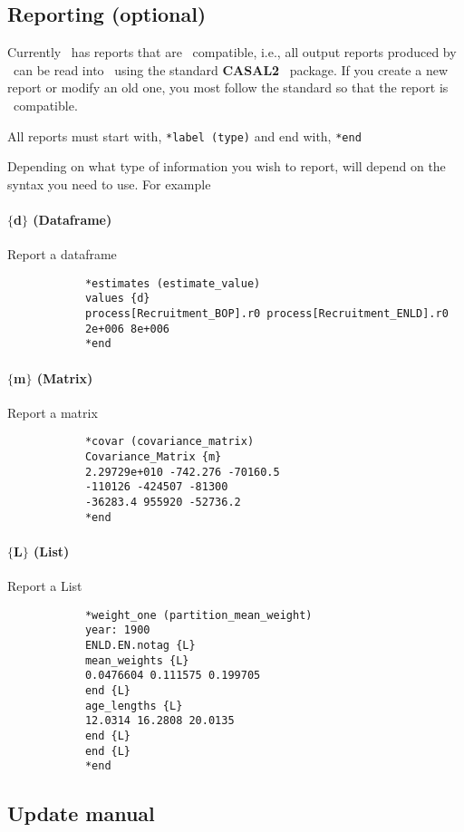 \subsection{Reporting (optional)}

Currently \CNAME\ has reports that are \R\ compatible, i.e., all output reports produced by \CNAME\ can be read into \R\ using the standard  \textbf{CASAL2} \R\ package. If you create a new report or modify an old one, you most follow the standard so that the report is \R\ compatible.

All reports must start with,
\texttt{*label (type)}
and end with,
\texttt{*end}

Depending on what type of information you wish to report, will depend on the syntax you need to use. For example

\paragraph*{$\{$d$\}$ (Dataframe)}
Report a dataframe
{\small{\begin{verbatim}
			*estimates (estimate_value)
			values {d}
			process[Recruitment_BOP].r0 process[Recruitment_ENLD].r0 
			2e+006 8e+006
			*end
\end{verbatim}}}

\paragraph*{$\{$m$\}$ (Matrix)}
Report a matrix
{\small{\begin{verbatim}
			*covar (covariance_matrix)
			Covariance_Matrix {m}
			2.29729e+010 -742.276 -70160.5
			-110126 -424507 -81300 
			-36283.4 955920 -52736.2 
			*end
\end{verbatim}}}

\paragraph*{$\{$L$\}$ (List)}
Report a List
{\small{\begin{verbatim}
			*weight_one (partition_mean_weight)
			year: 1900
			ENLD.EN.notag {L}
			mean_weights {L}
			0.0476604 0.111575 0.199705
			end {L}
			age_lengths {L}
			12.0314 16.2808 20.0135
			end {L}
			end {L}
			*end
\end{verbatim}}}

\subsection{Update manual}

